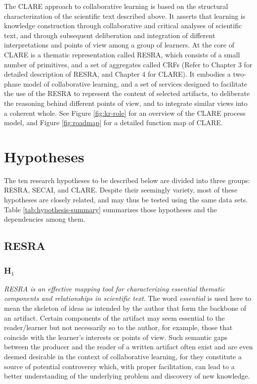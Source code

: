The CLARE approach to collaborative learning is based on the structural
characterization of the scientific text described above. It asserts that
learning is knowledge construction through collaborative and critical
analyses of scientific text, and through subsequent deliberation and
integration of different interpretations and points of view among a group
of learners. At the core of CLARE is a thematic representation called
RESRA, which consists of a small number of primitives, and a set of
aggregates called CRFs (Refer to Chapter 3 for detailed description of
RESRA, and Chapter 4 for CLARE). It embodies a two-phase model of
collaborative learning, and a set of services designed to facilitate the
use of the RESRA to represent the content of selected artifacts, to
deliberate the reasoning behind different points of view, and to integrate
similar views into a coherent whole. See Figure \ref{fig:kr-role} for an
overview of the CLARE process model, and Figure \ref{fig:roadmap} for a
detailed function map of CLARE.


\section{Hypotheses}
\label{sec:hypothesis}

The ten research hypotheses to be described below are divided into three
groups: RESRA, SECAI, and CLARE. Despite their seemingly variety, most of
these hypotheses are closely related, and may thus be tested using the same
data sets. Table \ref{tab:hypothesis-summary} summarizes those hypotheses
and the dependencies among them.

\subsection{RESRA}
\label{sec:resra hypothesis}


\subsubsection{H\(_1\)}
\label{sec:RESRA1}

{\it RESRA is an effective mapping tool for characterizing essential
thematic components and relationships in scientific text.} The word {\it
essential\/} is used here to mean the skeleton of ideas as intended by the
author that form the backbone of an artifact. Certain components of the
artifact may seem essential to the reader/learner but not necessarily so to
the author, for example, those that coincide with the learner's interests
or points of view. Such semantic gaps between the producer and the reader
of a written artifact often exist and are even deemed desirable in the
context of collaborative learning, for they constitute a source of
potential controversy which, with proper facilitation, can lead to a better
understanding of the underlying problem and discovery of new knowledge.


